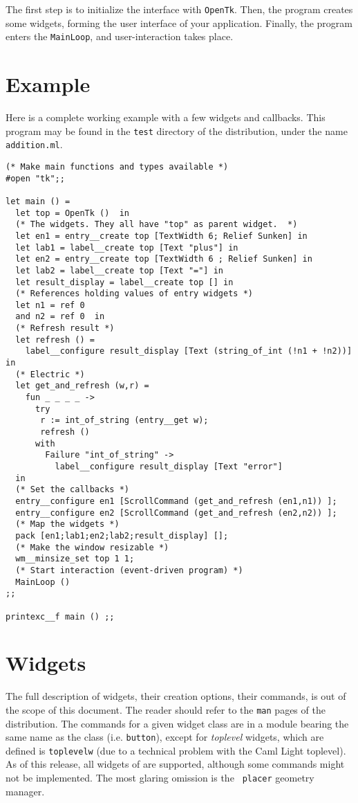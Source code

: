 The first step is to initialize the interface with \verb|OpenTk|.
Then, the program creates some widgets, forming the user interface of your
application. Finally, the program enters the \verb|MainLoop|, and
user-interaction takes place.

\section{Example}
Here is a complete working example with a few widgets and callbacks.
This program may be found in the \verb|test| directory of the distribution,
under the name \verb|addition.ml|.

\begin{verbatim}
(* Make main functions and types available *)
#open "tk";;

let main () =
  let top = OpenTk ()  in
  (* The widgets. They all have "top" as parent widget.  *)
  let en1 = entry__create top [TextWidth 6; Relief Sunken] in
  let lab1 = label__create top [Text "plus"] in
  let en2 = entry__create top [TextWidth 6 ; Relief Sunken] in
  let lab2 = label__create top [Text "="] in
  let result_display = label__create top [] in
  (* References holding values of entry widgets *)
  let n1 = ref 0
  and n2 = ref 0  in
  (* Refresh result *)
  let refresh () =
    label__configure result_display [Text (string_of_int (!n1 + !n2))]  in
  (* Electric *)
  let get_and_refresh (w,r) =
    fun _ _ _ _ ->
      try
       r := int_of_string (entry__get w);
       refresh ()
      with
        Failure "int_of_string" ->
          label__configure result_display [Text "error"]
  in
  (* Set the callbacks *)
  entry__configure en1 [ScrollCommand (get_and_refresh (en1,n1)) ];
  entry__configure en2 [ScrollCommand (get_and_refresh (en2,n2)) ];
  (* Map the widgets *)
  pack [en1;lab1;en2;lab2;result_display] [];
  (* Make the window resizable *)
  wm__minsize_set top 1 1;
  (* Start interaction (event-driven program) *)
  MainLoop ()
;;

printexc__f main () ;;
\end{verbatim}


\section{Widgets}
The full description of widgets, their creation options, their commands, is
out of the scope of this document. The reader should refer to the \verb|man|
pages of the distribution. The commands for a given widget class are in 
a module bearing the same name as the class (i.e. \verb|button|), except
for {\em toplevel} widgets, which are defined is \verb|toplevelw| (due to a 
technical problem with the Caml Light toplevel).
As of this release, all widgets of  are supported, although some
commands might not be implemented. The most glaring omission is the {\tt
placer} geometry manager.

